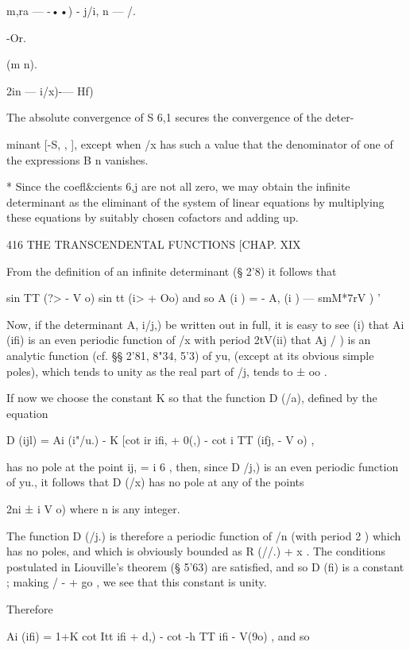  m,ra — -••) - j/i, n — /.  



-Or. 



(m   n). 



 2in — i/x)-— Hf) 

The absolute convergence of S 6,1 secures the convergence of the deter- 

minant [-S, ,  ], except when /x has such a value that the denominator of one 
of the expressions B  n vanishes. 

* Since the coefl\&cients 6,j are not all zero, we may obtain the infinite determinant as the 
eliminant of the system of linear equations by multiplying these equations by suitably chosen 
cofactors and adding up. 



416 THE TRANSCENDENTAL FUNCTIONS [CHAP. XIX 

From the definition of an infinite determinant (§ 2'8) it follows that 

sin  TT (?> - V o) sin  tt (i> + \/Oo) 
and so A (i ) = - A, (i ) — smM*7rV  ) ' 

Now, if the determinant A,  i/j,) be written out in full, it is easy to see 
(i) that Ai (ifi) is an even periodic function of /x with period 2tV(ii) that Aj   / ) 
is an analytic function (cf. §§ 2'81, 8"34, 5'3) of yu, (except at its obvious simple 
poles), which tends to unity as the real part of /j, tends to ± oo . 

If now we choose the constant K so that the function D (/a), defined by 
the equation 

D (ijl) = Ai (i"/u.) - K [cot  ir  ifi, + \/0(,) - cot i TT (ifj, - V o) , 

has no pole at the point ij, = i  6 , then, since D  /j,) is an even periodic 
function of yu., it follows that D (/x) has no pole at any of the points 

2ni ± i V o) 
where n is any integer. 

The function D (/j.) is therefore a periodic function of /n (with period 2 ) 
which has no poles, and which is obviously bounded as R (//.)   + x . The 
conditions postulated in Liouville's theorem (§ 5'63) are satisfied, and so D (fi) 
is a constant ; making / -  + go , we see that this constant is unity. 

Therefore 

Ai (ifi) = 1+K  cot Itt  ifi + \/d,) - cot -h TT  ifi - V(9o) , 
and so 

